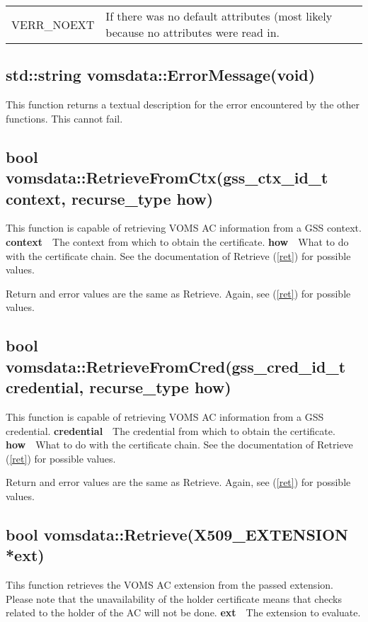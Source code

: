 \documentclass[a4paper]{book}
\newcommand{\parameter}[2]{\newline\textbf{#1}\ \ #2}
\begin{document}
\bigskip\begin{tabular}{lp{3in}}
VERR\_NOEXT & If there was no default attributes (most likely because
no attributes were read in.\\
\end{tabular}

\subsection{std::string vomsdata::ErrorMessage(void)}

This function returns a textual description for the error encountered
by the other functions.  This cannot fail.

\subsection{bool vomsdata::RetrieveFromCtx(gss\_ctx\_id\_t context,
  recurse\_type how)}

This function is capable of retrieving VOMS AC information from a GSS
context.
\parameter{context}{The context from which to obtain the certificate.}
\parameter{how}{What to do with the certificate chain. See the
documentation of Retrieve (\ref{ret}) for possible values.}

Return and error values are the same as Retrieve.  Again, see
(\ref{ret}) for possible values.

\subsection{bool vomsdata::RetrieveFromCred(gss\_cred\_id\_t credential,
  recurse\_type how)}

This function is capable of retrieving VOMS AC information from a GSS
credential.
\parameter{credential}{The credential from which to obtain the certificate.}
\parameter{how}{What to do with the certificate chain. See the
documentation of Retrieve (\ref{ret}) for possible values.}

Return and error values are the same as Retrieve.  Again, see
(\ref{ret}) for possible values.

\subsection{bool vomsdata::Retrieve(X509\_EXTENSION *ext)}

Tihs function retrieves the VOMS AC extension from the passed
extension.  Please note that the unavailability of the holder
certificate means that checks related to the holder of the AC will not
be done.
\parameter{ext}{The extension to evaluate.}
\end{document}
